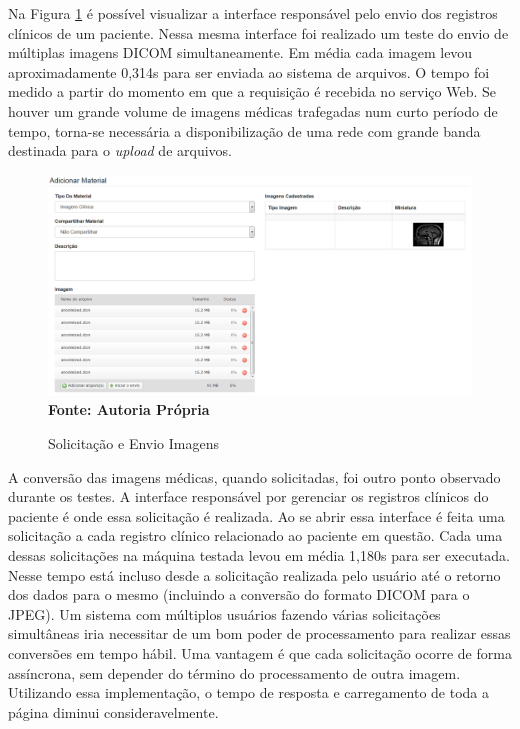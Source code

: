Na Figura \ref{fig:figura3} é possível visualizar a interface responsável pelo envio dos registros clínicos de um paciente. Nessa mesma interface foi realizado um teste do envio de múltiplas imagens DICOM simultaneamente. Em média cada imagem levou aproximadamente 0,314s para ser enviada ao sistema de arquivos. O tempo foi medido a partir do momento em que a requisição é recebida no serviço Web. Se houver um grande volume de imagens médicas trafegadas num curto período de tempo, torna-se necessária a disponibilização de uma rede com grande banda destinada para o \textit{upload} de arquivos.

\begin{figure}[ht]
	\centering	
	\caption[\hspace{0.1cm}Imagens Clínicas.]{Solicitação e Envio Imagens}
	\vspace{-0.4cm}
	\includegraphics[width=1.0\textwidth]{figuras/envioMultiplasImagens15mb.png}
	\vspace{-0.2cm}
	\\\textbf{\footnotesize Fonte: Autoria Própria }
	\label{fig:figura3}
\end{figure}

A conversão das imagens médicas, quando solicitadas, foi outro ponto observado durante os testes. A interface responsável por gerenciar os registros clínicos do paciente é onde essa solicitação é realizada. Ao se abrir essa interface é feita uma solicitação a cada registro clínico relacionado ao paciente em questão. Cada uma dessas solicitações na máquina testada levou em média 1,180s para ser executada. Nesse tempo está incluso desde a solicitação realizada pelo usuário até o retorno dos dados para o mesmo (incluindo a conversão do formato DICOM para o JPEG). Um sistema com  múltiplos usuários fazendo várias solicitações simultâneas iria necessitar de um bom poder de processamento para realizar essas conversões em tempo hábil. Uma vantagem é que cada solicitação ocorre de forma assíncrona, sem depender do término do processamento de outra imagem. Utilizando essa implementação, o tempo de resposta e carregamento de toda a página diminui consideravelmente.

